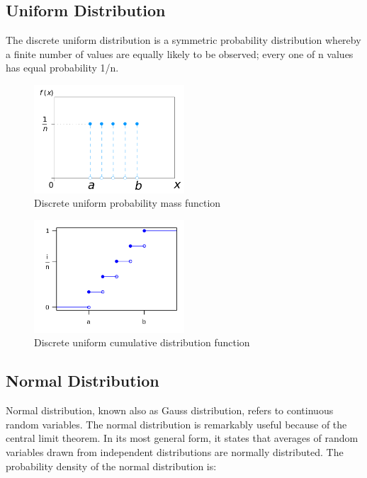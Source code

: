 \subsection{Uniform Distribution}

The discrete uniform distribution is a symmetric probability distribution whereby a finite number of values are equally likely to be observed; 
every one of n values has equal probability 1/n. 

\begin{figure}[H]
  \centering
  \includegraphics[width=0.5\textwidth]{figures/uniform_1.png}
  \caption{Discrete uniform probability mass function}
\end{figure}

\begin{figure}[H]
  \centering
  \includegraphics[width=0.5\textwidth]{figures/uniform_2.png}
  \caption{Discrete uniform cumulative distribution function}
\end{figure}

\subsection{Normal Distribution}

Normal distribution, known also as Gauss distribution, refers to continuous random variables. 
The normal distribution is remarkably useful because of the central limit theorem. In its most general form, it states that averages of random variables 
drawn from independent distributions are normally distributed. The probability density of the normal distribution is:

